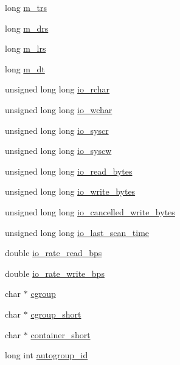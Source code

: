 \begin{DoxyCompactItemize}
\item 
long \hyperlink{structPCPProcess___ab798e9a0daa55ad43f1ddef191554924}{m\+\_\+trs}
\item 
long \hyperlink{structPCPProcess___a4806e221fe5856e935b180e4af2b9fc4}{m\+\_\+drs}
\item 
long \hyperlink{structPCPProcess___ace51f54605eefbc3d2a2aace73da132a}{m\+\_\+lrs}
\item 
long \hyperlink{structPCPProcess___a29667914381c0ec27d9a571d2598bd3b}{m\+\_\+dt}
\item 
unsigned long long \hyperlink{structPCPProcess___a7c4015f104e74c2caa221a2dcb76a579}{io\+\_\+rchar}
\item 
unsigned long long \hyperlink{structPCPProcess___ab65cc013d8bffb08d3763b764db727f9}{io\+\_\+wchar}
\item 
unsigned long long \hyperlink{structPCPProcess___ad4e0717c61b18f68a017cbf71433ff1a}{io\+\_\+syscr}
\item 
unsigned long long \hyperlink{structPCPProcess___a7c3fb04559e6d57da0df59f0353e1023}{io\+\_\+syscw}
\item 
unsigned long long \hyperlink{structPCPProcess___ae54a4036a10d57137e327a2733c5a39c}{io\+\_\+read\+\_\+bytes}
\item 
unsigned long long \hyperlink{structPCPProcess___aa5e915870e8f5036226f9d5c83fa8b32}{io\+\_\+write\+\_\+bytes}
\item 
unsigned long long \hyperlink{structPCPProcess___a9cc2e5536a6a500ea22c23bf341971b1}{io\+\_\+cancelled\+\_\+write\+\_\+bytes}
\item 
unsigned long long \hyperlink{structPCPProcess___a850ee23b4de2ad6960b15b9e0b3f5958}{io\+\_\+last\+\_\+scan\+\_\+time}
\item 
double \hyperlink{structPCPProcess___a4eb69435274820496bc8662b5a322262}{io\+\_\+rate\+\_\+read\+\_\+bps}
\item 
double \hyperlink{structPCPProcess___aceeb20592ae87171e24ada6c9bded0db}{io\+\_\+rate\+\_\+write\+\_\+bps}
\item 
char $\ast$ \hyperlink{structPCPProcess___a16a2d5c56a96045ffb30781646655c25}{cgroup}
\item 
char $\ast$ \hyperlink{structPCPProcess___aa6408a9294fb83de51136892fd706f9a}{cgroup\+\_\+short}
\item 
char $\ast$ \hyperlink{structPCPProcess___a61afd86f63443086e3680855a1b57cc8}{container\+\_\+short}
\item 
long int \hyperlink{structPCPProcess___a6577ca9e89f6097c32f4b43317d0ac93}{autogroup\+\_\+id}

\end{DoxyCompactItemize}
